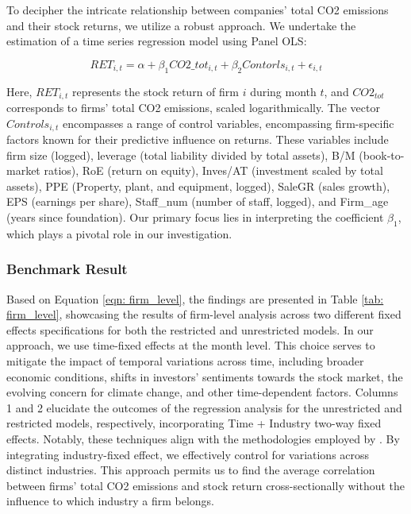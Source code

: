 \documentclass[12pt]{article}
\begin{document}
To decipher the intricate relationship between companies' total CO2 emissions and their stock returns, we utilize a robust approach. We undertake the estimation of a time series regression model using Panel OLS:

\begin{equation}
    \label{eqn: firm_level}
    RET_{i,t} = \alpha + \beta_1 CO2\_tot_{i,t} + \beta_2 Contorls_{i,t} + \epsilon_{i,t}
\end{equation}

Here, $RET_{i,t}$ represents the stock return of firm $i$ during month $t$, and $CO2_{tot}$ corresponds to firms' total CO2 emissions, scaled logarithmically. The vector $Controls_{i,t}$ encompasses a range of control variables, encompassing firm-specific factors known for their predictive influence on returns. These variables include firm size (logged), leverage (total liability divided by total assets), B/M (book-to-market ratios), RoE (return on equity), Inves/AT (investment scaled by total assets), PPE (Property, plant, and equipment, logged), SaleGR (sales growth), EPS (earnings per share), Staff\_num (number of staff, logged), and Firm\_age (years since foundation). Our primary focus lies in interpreting the coefficient $\beta_1$, which plays a pivotal role in our investigation.

\subsubsection{Benchmark Result}

Based on Equation \ref{eqn: firm_level}, the findings are presented in Table \ref{tab: firm_level}, showcasing the results of firm-level analysis across two different fixed effects specifications for both the restricted and unrestricted models. In our approach, we use time-fixed effects at the month level. This choice serves to mitigate the impact of temporal variations across time, including broader economic conditions, shifts in investors' sentiments towards the stock market, the evolving concern for climate change, and other time-dependent factors. Columns 1 and 2 elucidate the outcomes of the regression analysis for the unrestricted and restricted models, respectively, incorporating Time + Industry two-way fixed effects. Notably, these techniques align with the methodologies employed by \cite{bolton2021investors}. By integrating industry-fixed effect, we effectively control for variations across distinct industries. This approach permits us to find the average correlation between firms' total CO2 emissions and stock return cross-sectionally without the influence to which industry a firm belongs. 
\end{document}
